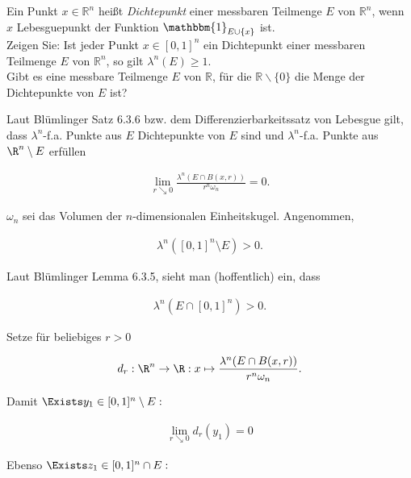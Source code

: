 \begin{exercise}

Ein Punkt $x \in \mathbb{R}^n$ heißt \textit{Dichtepunkt} einer messbaren Teilmenge $E$ von $\mathbb{R}^n$, wenn $x$ Lebesguepunkt der Funktion $\mathbbm{1}_{E\cup\{x\}}$ ist. \\

Zeigen Sie: Ist jeder Punkt $x \in [0,1]^n$ ein Dichtepunkt einer messbaren Teilmenge $E$ von $\mathbb{R}^n$, so gilt $\lambda^n(E) \geq 1$. \\

Gibt es eine messbare Teilmenge $E$ von $\mathbb{R}$, für die $\mathbb{R}\backslash\{0\}$ die Menge der Dichtepunkte von $E$ ist?

\end{exercise}

\begin{solution}

Laut Blümlinger Satz 6.3.6 bzw. dem Differenzierbarkeitssatz von Lebesgue gilt, dass $\lambda^n$-f.a. Punkte aus $E$ Dichtepunkte von $E$ sind und $\lambda^n$-f.a. Punkte aus $\R^n \setminus E$ erfüllen

\begin{align*}
    \lim_{r\searrow 0}\frac{\lambda^n(E\cap B(x,r))}{r^n\omega_n}=0.
\end{align*}

$\omega_n$ sei das Volumen der $n$-dimensionalen Einheitskugel. Angenommen,

\begin{align*}
    \lambda^n([0,1]^n \setminus E) > 0.
\end{align*}

Laut Blümlinger Lemma 6.3.5, sieht man (hoffentlich) ein, dass

\begin{align*}
    \lambda^n(E\cap[0,1]^n)>0.
\end{align*}

Setze für beliebiges $r > 0$

\begin{align*}
  d_r:
  \R^n \to \R:
  x \mapsto \frac{\lambda^n (E \cap B(x,r))}{r^n\omega_n}.
\end{align*}

Damit $\Exists y_1 \in [0,1]^n \setminus E:$

\begin{align*}
    \lim_{r\searrow 0} d_r(y_1) = 0
\end{align*}

Ebenso $\Exists z_1 \in [0,1]^n \cap E:$


\end{solution}
